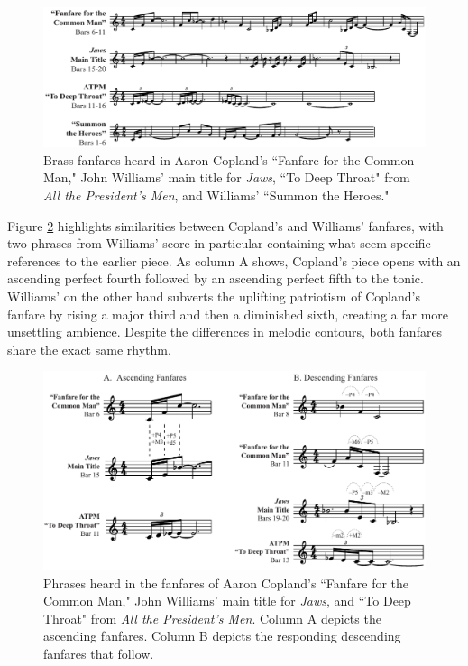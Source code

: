 \begin{figure}
    \centering
    \includegraphics[width=1\linewidth]{img/president-jaws-copland.pdf}
    \caption{Brass fanfares heard in Aaron Copland's ``Fanfare for the Common Man," John Williams' main title for \textit{Jaws}, ``To Deep Throat" from \textit{All the President's Men}, and Williams' ``Summon the Heroes."}
    \label{fig:president-jaws-copland}
\end{figure}

Figure \ref{fig:president-jaws-copland-para} highlights similarities between Copland's and Williams' fanfares, with two phrases from Williams' score in particular containing what seem specific references to the earlier piece.
As column A shows, Copland's piece opens with an ascending perfect fourth followed by an ascending perfect fifth to the tonic.
Williams' on the other hand subverts the uplifting patriotism of Copland's fanfare by rising a major third and then a diminished sixth, creating a far more unsettling ambience.
Despite the differences in melodic contours, both fanfares share the exact same rhythm.

\begin{figure}
    \centering
    \includegraphics[width=1\linewidth]{img/president-jaws-copland-para.pdf}
    \caption{Phrases heard in the fanfares of Aaron Copland's ``Fanfare for the Common Man," John Williams' main title for \textit{Jaws}, and ``To Deep Throat" from \textit{All the President's Men}. Column A depicts the ascending fanfares. Column B depicts the responding descending fanfares that follow.}
    \label{fig:president-jaws-copland-para}\end{figure}


